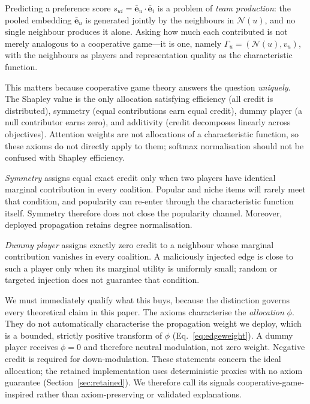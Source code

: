 \documentclass[a4paper,fleqn,longmktitle]{cas-dc}
\begin{document}
Predicting a preference score $s_{ui} = \bar{\mathbf{e}}_u \cdot
\bar{\mathbf{e}}_i$ is a problem of \emph{team production}: the pooled
embedding $\bar{\mathbf{e}}_u$ is generated jointly by the neighbours in
$\mathcal{N}(u)$, and no single neighbour produces it alone. Asking how much
each contributed is not merely analogous to a cooperative game---it is one,
namely $\Gamma_u = (\mathcal{N}(u), v_u)$, with the neighbours as players and
representation quality as the characteristic function.

This matters because cooperative game theory answers the question
\emph{uniquely}. The Shapley value \citep{shapley1953value} is the only
allocation satisfying efficiency (all credit is distributed), symmetry
(equal contributions earn equal credit), dummy player (a null contributor
earns zero), and additivity (credit decomposes linearly across objectives).
Attention weights are not allocations of a characteristic function, so these
axioms do not directly apply to them; softmax normalisation should not be
confused with Shapley efficiency.

\emph{Symmetry} assigns equal exact credit only when two players have identical
marginal contribution in every coalition. Popular and niche items will rarely
meet that condition, and popularity can re-enter through the characteristic
function itself. Symmetry therefore does not close the popularity channel.
Moreover, deployed propagation retains degree normalisation.

\emph{Dummy player} assigns exactly zero credit to a neighbour whose marginal
contribution vanishes in every coalition. A maliciously injected edge is close
to such a player only when its marginal utility is uniformly small; random or
targeted injection does not guarantee that condition.

We must immediately qualify what this buys, because the distinction governs
every theoretical claim in this paper. The axioms characterise the
\emph{allocation} $\phi$. They do not automatically characterise the
propagation weight we deploy, which is a bounded, strictly positive transform
of $\phi$ (Eq.~\eqref{eq:edgeweight}). A dummy player receives $\phi = 0$ and
therefore neutral modulation, not zero weight. Negative credit is required for
down-modulation. These statements concern the ideal allocation; the retained
implementation uses deterministic proxies with no axiom guarantee
(Section~\ref{sec:retained}). We therefore call its signals
cooperative-game-inspired rather than axiom-preserving or validated
explanations.
\end{document}
